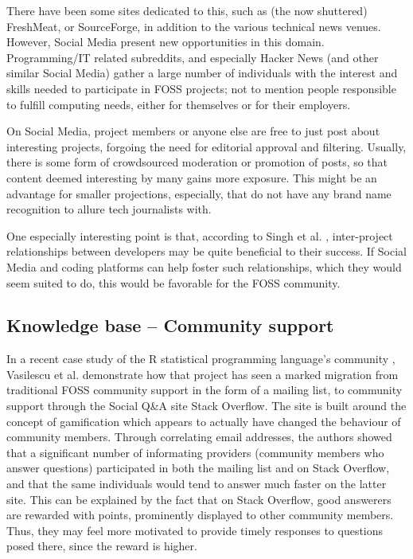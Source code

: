 \documentclass[a4paper,11pt]{article} %
\begin{document}
There have been some sites dedicated to this, such as (the now
shuttered) FreshMeat, or SourceForge, in addition to the various
technical news venues. However, Social Media present new opportunities
in this domain. Programming/IT related subreddits, and especially
Hacker News (and other similar Social Media) gather a large number of
individuals with the interest and skills needed to participate in FOSS
projects; not to mention people responsible to fulfill computing
needs, either for themselves or for their employers.

On Social Media, project members or anyone else are free to just post
about interesting projects, forgoing the need for editorial approval
and filtering. Usually, there is some form of crowdsourced moderation
or promotion of posts, so that content deemed interesting by many
gains more exposure. This might be an advantage for smaller
projections, especially, that do not have any brand name recognition
to allure tech journalists with.

One especially interesting point is that, according to Singh et
al. \cite{singh2011network}, inter-project relationships between developers
may be quite beneficial to their success. If Social Media and coding
platforms can help foster such relationships, which they would seem suited
to do, this would be favorable for the FOSS community.

\subsection{Knowledge base -- Community support}

In a recent case study of the R statistical programming language's
community \cite{Vasilescu14StackOverflow}, Vasilescu et
al. demonstrate how that project has seen a marked migration from
traditional FOSS community support in the form of a mailing list, to
community support through the Social Q\&{}A site Stack Overflow. The
site is built around the concept of
gamification\cite{deterding2011game} which appears to actually have
changed the behaviour of community members. Through correlating email
addresses, the authors showed that a significant number of informating
providers (community members who answer questions) participated in
both the mailing list and on Stack Overflow, and that the same
individuals would tend to answer much faster on the latter site. This
can be explained by the fact that on Stack Overflow, good answerers
are rewarded with points, prominently displayed to other community
members. Thus, they may feel more motivated to provide timely
responses to questions posed there, since the reward is higher.
\end{document}
